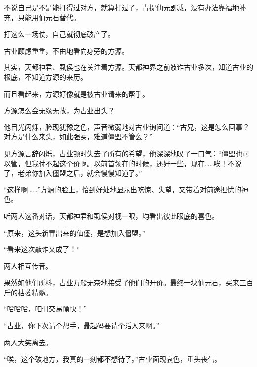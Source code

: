 \begin{this_body}
不说自己是不是能打得过对方，就算打过了，青提仙元剧减，没有办法靠福地补充，只能用仙元石替代。

打这么一场仗，自己就彻底破产了。

古业顾虑重重，不由地看向身旁的方源。

其实，天都神君、虱侯也在关注着方源。天都神界之前敲诈古业多次，知道古业的根底，不知道方源的来历。

而且看起来，方源好像就是被古业请来的帮手。

方源怎么会无缘无故，为古业出头？

他目光闪烁，脸现犹豫之色，声音微弱地对古业询问道：“古兄，这是怎么回事？对方是什么来头，如此强买，难道僵盟不管么？”

见方源言辞闪烁，古业顿时失去了所有的希望，他深深地叹了一口气：“僵盟也可以管，但我付不起这个价啊。以前首领在的时候，还好一些，现在……唉！不说了，老弟你加入僵盟之后，就会慢慢知道了。”

“这样啊……”方源的脸上，恰到好处地显示出吃惊、失望，又带着对前途担忧的神色。

听两人这番对话，天都神君和虱侯对视一眼，均看出彼此眼底的喜色。

“原来，这头新冒出来的仙僵，是想加入僵盟。”

“看来这次敲诈又成了！”

两人相互传音。

果然如他们所料，古业万般无奈地接受了他们的开价。最终一块仙元石，买来三百斤的枯萎精髓。

“哈哈哈，咱们交易愉快！”

“古业，你下次请个帮手，最起码要请个活人来啊。”

两人大笑离去。

“唉，这个破地方，我真的一刻都不想待了。”古业面现哀色，垂头丧气。

\end{this_body}

